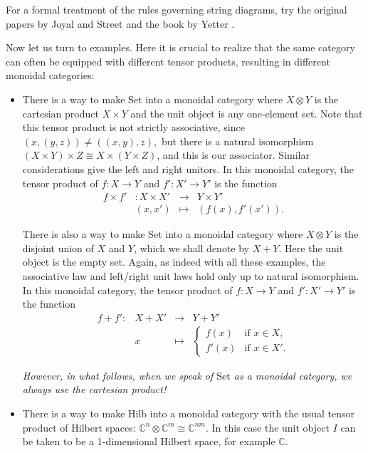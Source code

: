 \documentclass[12pt,twoside,openright]{report}
\newcommand{\CC}{\mathbb{C}}
\newcommand{\Hilb}{\mathrm{Hilb}}
\newcommand{\Set}{\mathrm{Set}}
\newcommand{\maps}{\colon}
\newcommand{\iso}{\cong}
\newcommand{\tensor}{\otimes}
\renewcommand{\text}{\mbox}
\begin{document}
For a formal treatment of the rules governing string diagrams, try the original papers by Joyal and Street \cite{JS0}
and the book by Yetter \cite{Yetter}.

Now let us turn to examples.  Here it is crucial to realize that the same category can often be equipped with different tensor products, resulting in different monoidal categories:

\begin{itemize}

\item There is a way to make $\Set$ into a monoidal category where
$X \tensor Y$ is the cartesian product $X \times Y$ and the unit object is any one-element set.  Note that this tensor product is not strictly associative, since $(x, (y, z)) \ne ((x, y), z),$ but there is a natural isomorphism $(X \times Y) \times Z \iso X \times (Y \times Z)$, and this is our associator.  Similar considerations give the left and right unitors.  In this monoidal category, the tensor product of $f \maps X \to Y$ and $f' \maps X' \to Y'$ is the function
\[
\begin{array}{rccl}
        f \times f' & \maps X\times X'& \to& Y\times Y' \\
                    & (x,x') &\mapsto & (f(x),f'(x')) .
\end{array}
\]

There is also a way to make $\Set$ into a monoidal category where
$X \tensor Y$ is the disjoint union of $X$ and $Y$, which we shall denote by $X + Y$.  Here the unit object is the empty set. Again, as indeed with all these examples, the associative law and left/right unit laws hold only up to natural isomorphism.  In this monoidal category, the tensor product of $f \maps X \to Y$ and 
$f' \maps X' \to Y'$ is the function
\[
\begin{array}{rccl}
 f+f' \maps & X+X'  &\to&  Y+Y'  \\
           &      x &\mapsto& 
\left\{
\begin{array}{cl} 
f(x) & \text{if $x \in X$,} \\ 
f'(x) & \text{if $x \in X'$.}
\end{array} \right.
\end{array}
\]

{\em However, in what follows, when we speak of $\Set$ as a monoidal category, we always use the cartesian product!}

\item There is a way to make $\Hilb$ into a monoidal category with the usual tensor product of Hilbert spaces: $\CC^n \tensor \CC^m \cong 
\CC^{nm}.$  In this case the unit object $I$ can be taken to be a
1-dimensional Hilbert space, for example $\CC$.  


\end{itemize}
\end{document}
